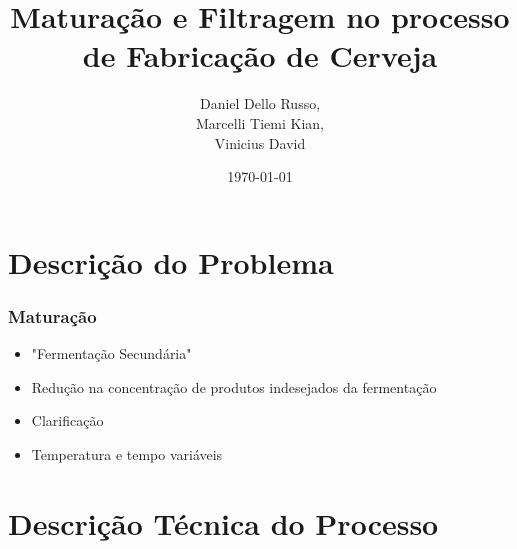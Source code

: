 \documentclass{beamer}
\title[Projeto Final]{Maturação e Filtragem no processo de Fabricação de Cerveja} %
\author{Daniel Dello Russo,\\ Marcelli Tiemi Kian,\\ Vinicius David} %
\institute[FEM] %
{
Universidade Estadual de Campinas \\ %
\medskip
\textit{} %
}
\date{\today} %
\begin{document}
\begin{frame}
\titlepage %
\end{frame}

\begin{frame}

\tableofcontents %
\end{frame}


\section{Descrição do Problema}
\begin{frame}
	\frametitle{Maturação}
	\begin{itemize}
		\item "Fermentação Secundária"
		\item Redução na concentração de produtos indesejados da fermentação
		\item Clarificação
		\item Temperatura e tempo variáveis
	\end{itemize}
\end{frame}

\section{Descrição Técnica do Processo} 
\end{document}
